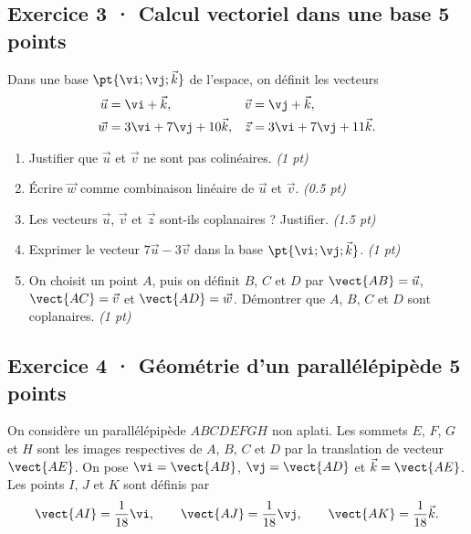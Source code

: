 \mxnewpage{}

\subsection*{Exercice 3 · Calcul vectoriel dans une base \hfill 5 points}Dans une base $\pt{\vi;\vj;\vec k}$ de l'espace, on définit les vecteurs
\[\begin{aligned}\vec u&=\vi+\vec k,&\vec v&=\vj+\vec k,\\
\vec w&=3\vi+7\vj+10\vec k,&\vec z&=3\vi+7\vj+11\vec k.\end{aligned}\]

\begin{enumerate}

\item Justifier que $\vec u$ et $\vec v$ ne sont pas colinéaires. \hfill\textit{(1 pt)}

\item Écrire $\vec w$ comme combinaison linéaire de $\vec u$ et $\vec v$. \hfill\textit{(\num{0,5} pt)}

\item Les vecteurs $\vec u$, $\vec v$ et $\vec z$ sont-ils coplanaires ? Justifier. \hfill\textit{(\num{1,5} pt)}

\item Exprimer le vecteur $7\vec u-3\vec v$ dans la base $\pt{\vi;\vj;\vec k}$. \hfill\textit{(1 pt)}

\item On choisit un point $A$, puis on définit $B$, $C$ et $D$ par $\vect{AB}=\vec u$, $\vect{AC}=\vec v$ et $\vect{AD}=\vec w$. Démontrer que $A$, $B$, $C$ et $D$ sont coplanaires. \hfill\textit{(1 pt)}

\end{enumerate}

\subsection*{Exercice 4 · Géométrie d'un parallélépipède \hfill 5 points}On considère un parallélépipède $ABCDEFGH$ non aplati. Les sommets $E$, $F$, $G$ et $H$ sont les images respectives de $A$, $B$, $C$ et $D$ par la translation de vecteur $\vect{AE}$.
On pose $\vi=\vect{AB}$, $\vj=\vect{AD}$ et $\vec k=\vect{AE}$.
Les points $I$, $J$ et $K$ sont définis par
\[\vect{AI}=\frac1{18}\vi,\qquad\vect{AJ}=\frac1{18}\vj,\qquad\vect{AK}=\frac1{18}\vec k.\]

